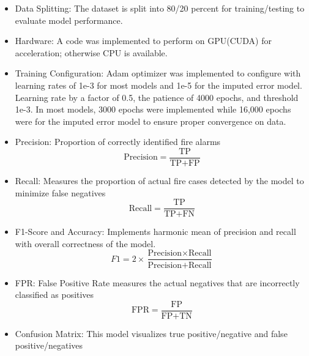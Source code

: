 \documentclass[conference]{IEEEtran}
\begin{document}
\begin{itemize}
\item Data Splitting: The dataset is split into 80/20 percent for training/testing to evaluate model performance. 
\item Hardware: A code was implemented to perform on GPU(CUDA) for acceleration; otherwise CPU is available. 
\item Training Configuration: Adam optimizer was implemented to configure with learning rates of 1e-3 for most models and 1e-5 for the imputed error model. Learning rate by a factor of 0.5, the patience of 4000 epochs, and threshold 1e-3. In most models, 3000 epochs were implemented while 16,000 epochs were for the imputed error model to ensure proper convergence on data. 
\item Precision: Proportion of correctly identified fire alarms 
\begin{equation}
    \text{Precision} = \frac{\text{TP}}{\text{TP} + \text{FP}}
\end{equation}
\item Recall: Measures the proportion of actual fire cases detected by the model to minimize false negatives
\begin{equation}
    \text{Recall} = \frac{\text{TP}}{\text{TP} + \text{FN}}
\end{equation}
\item F1-Score and Accuracy: Implements harmonic mean of precision and recall with overall correctness of the model.
\begin{equation}
    F1 = 2 \times \frac{\text{Precision} \times \text{Recall}}{\text{Precision} + \text{Recall}}
\end{equation}
\item FPR: False Positive Rate measures the actual negatives that are incorrectly classified as positives 
\begin{equation}
    \text{FPR} = \frac{\text{FP}}{\text{FP} + \text{TN}}
\end{equation}
\item Confusion Matrix: This model visualizes true positive/negative and false positive/negatives
\end{itemize}
\end{document}
